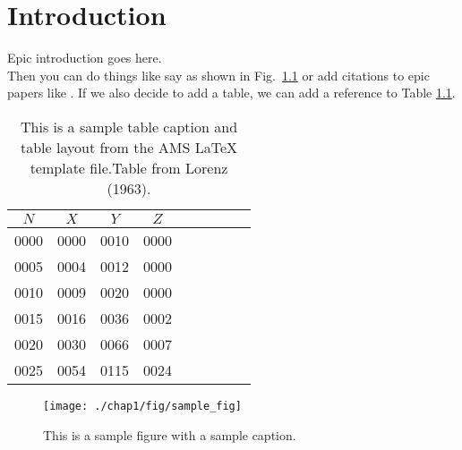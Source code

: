 \chapter{Introduction}
Epic introduction goes here.\\

Then you can do things like say as shown in Fig.\ \ref{fig:sample}
or add citations to epic papers like \cite{eliassen1951}. If we also decide
to add a table, we can add a reference to Table \ref{tab:lorenz}.

\begin{table}[t]
\caption[This caption appears in the LoT]{This is a sample table caption and
  table layout from the AMS LaTeX template file.Table from Lorenz (1963).}
\label{tab:lorenz}
\begin{center}
\begin{tabular}{ccccrrcrc}
\hline\hline
$N$ & $X$ & $Y$ & $Z$\\
\hline
 0000 & 0000 & 0010 & 0000 \\
 0005 & 0004 & 0012 & 0000 \\
 0010 & 0009 & 0020 & 0000 \\
 0015 & 0016 & 0036 & 0002 \\
 0020 & 0030 & 0066 & 0007 \\
 0025 & 0054 & 0115 & 0024 \\
\hline
\end{tabular}
\end{center}
\end{table}

\begin{figure}[h!]
    \centering
    \texttt{[image: ./chap1/fig/sample\_fig]}
    \caption[This caption is only in the LoF]{This is a sample figure with a
    sample caption.}
    \label{fig:sample}
\end{figure}
